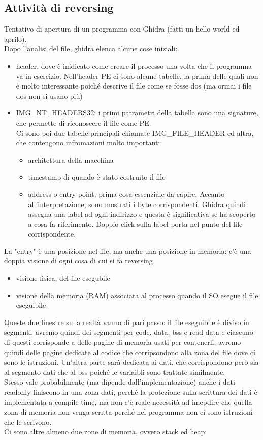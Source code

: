 \documentclass{article}
\begin{document}
\subsection{Attività di reversing}
Tentativo di apertura di un programma con Ghidra (fatti un hello world  ed aprilo).\\ Dopo l'analisi del file, ghidra elenca alcune cose iniziali:
\begin{itemize}
\item header, dove è inidicato come creare il processo una volta che il programma va in esercizio. Nell'header PE ci sono alcune tabelle, la prima delle quali non è molto interessante poiché descrive il file come se fosse dos (ma ormai i file dos non si usano più)
\item IMG\_NT\_HEADERS32: i primi patrametri della tabella sono una signature, che permette di riconoscere il file come PE.\\ Ci sono poi due tabelle principali chiamate IMG\_FILE\_HEADER ed altra, che contengono infromazioni molto importanti:
\begin{itemize}
\item architettura della macchina
\item timestamp di quando è stato costruito il file
\item address o entry point: prima cosa essenziale da capire. Accanto all'interpretazione, sono  mostrati i byte corrispondenti. Ghidra quindi assegna una label ad ogni indirizzo e questa è significativa se ha scoperto a cosa fa riferimento. Doppio click sulla label porta nel punto del file corrispondente.
\end{itemize}
\end{itemize}
La "entry" è una posizione nel file, ma anche una posizione in memoria: c'è una doppia visione di ogni cosa di cui si fa reversing
\begin{itemize}
\item visione fisica, del file esegubile
\item visione della memoria (RAM) associata al processo quando il SO esegue il file eseguibile
\end{itemize}
Queste due finestre sulla realtà vanno di pari passo: il file eseguibile è diviso in segmenti, avremo quindi dei segmenti per code, data, bss e read data e ciascuno di questi corrisponde a delle pagine di memoria usati per contenerli, avremo quindi delle pagine dedicate al codice che corripsondono alla zona del file dove ci sono le istruzioni. Un'altra parte sarà dedicata ai dati, che corrispondono però sia al segmento dati che al bss poiché le variaibli sono trattate similmente.\\ Stesso vale probabilmente (ma dipende dall'implementazione) anche i dati readonly finiscono in una zona dati, perché la protezione sulla scrittura dei dati è implementata a compile time, ma non c'è reale necessità ad imepdire che quella zona di memoria non venga scritta perché nel programma non ci sono istruzioni che le scrivono.\\ Ci sono altre almeno due zone di memoria, ovvero stack ed heap:
\end{document}
